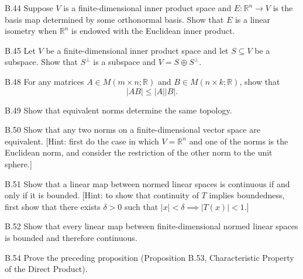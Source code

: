 \begin{exercise}{B.44}
    Suppose \( V \) is a finite-dimensional inner product space and \( E : \mathbb{R}^{n} \to V \) is the basis map determined by some orthonormal basis. Show that \( E \) is a linear isometry when \( \mathbb{R}^{n} \) is endowed with the Euclidean inner product.
\end{exercise}

\begin{exercise}{B.45}
    Let \( V \) be a finite-dimensional inner product space and let \( S \subseteq V \) be a subspace. Show that \( S^{\perp} \) is a subspace and \( V = S \oplus S^{\perp} \).
\end{exercise}

\begin{exercise}{B.48}
    For any matrices \( A \in M(m \times n; \mathbb{R}) \) and \( B \in M(n \times k; \mathbb{R}) \), show that \[ \left\vert AB \right\vert \le \left\vert A \right\vert \left\vert B \right\vert. \]
\end{exercise}

\begin{exercise}{B.49}
    Show that equivalent norms determine the same topology.
\end{exercise}

\begin{exercise}{B.50}
    Show that any two norms on a finite-dimensional vector space are equivalent. [Hint: first do the case in which \( V = \mathbb{R}^{n} \) and one of the norms is the Euclidean norm, and consider the restriction of the other norm to the unit sphere.]
\end{exercise}

\begin{exercise}{B.51}
    Show that a linear map between normed linear spaces is continuous if and only if it is bounded. [Hint: to show that continuity of \( T \) implies boundedness, first show that there exists \( \delta > 0 \) such that \( \left\vert x \right\vert < \delta \implies \left\vert T(x) \right\vert < 1 \).]
\end{exercise}

\begin{exercise}{B.52}
    Show that every linear map between finite-dimensional normed linear spaces is bounded and therefore continuous.
\end{exercise}

\begin{exercise}{B.54}
    Prove the preceding proposition (Proposition B.53, Characteristic Property of the Direct Product).
\end{exercise}

